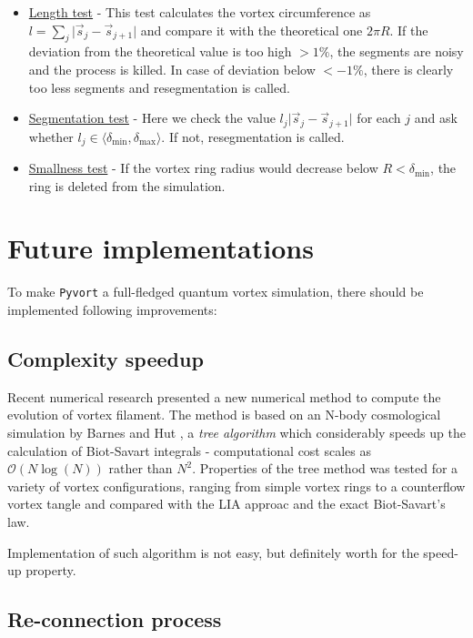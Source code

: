 \begin{itemize}
	\item \underline{Length test} - This test calculates the vortex circumference as $l = \sum_j \vert \vec{s}_j - \vec{s}_{j+1} \vert$ and compare it with the theoretical one $2\pi R$. If the deviation from the theoretical value is too high $>1\%$, the segments are noisy and the process is killed. In case of deviation below $<-1\%$, there is clearly too less segments and resegmentation is called.

	\item \underline{Segmentation test} - Here we check the value $l_j \vert \vec{s}_j - \vec{s}_{j+1} \vert$ for each $j$ and ask whether $l_j \in \langle \delta_{\text{min}}, \delta_{\text{max}} \rangle$. If not, resegmentation is called.

	\item \underline{Smallness test} - If the vortex ring radius would decrease below $R < \delta_{\text{min}}$, the ring is deleted from the simulation.
\end{itemize}

\section{Future implementations}

To make \texttt{Pyvort} a full-fledged quantum vortex simulation, there should be implemented following improvements:

\subsection*{Complexity speedup}

Recent numerical research presented \cite{tree_alg} a new numerical method to compute the evolution of vortex filament. The method is based on an N-body cosmological simulation by Barnes and Hut \cite{barnes}, a \textit{tree algorithm} which considerably speeds up the calculation of Biot-Savart integrals - computational cost scales as $\mathcal{O}(N \log(N))$ rather than $N^2$. Properties of the tree method was tested for a variety of vortex configurations, ranging from simple vortex rings to a counterflow vortex tangle and compared with the LIA approac and the exact Biot-Savart's law.

Implementation of such algorithm is not easy, but definitely worth for the speed-up property.


\subsection*{Re-connection process}

